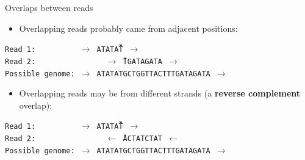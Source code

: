\documentclass[xcolor=dvipsnames]{beamer}
\begin{document}
\begin{frame}{Overlaps between reads}

    \begin{itemize}
    \item Overlapping reads probably came from adjacent positions:
    \end{itemize}

    {\tt Read 1: \ \ \ \ \ \ \ \ \ $\rightarrow$
        ATATAT\G{}\C{}\T{}\G{}\G{}\T{}\T{}\A{}\C{}\T{}\T{} $\rightarrow$ } \\
    {\tt Read 2: \ \ \ \ \ \ \ \ \ \ \ \ \ \ \ $\rightarrow$
        \G{}\C{}\T{}\G{}\G{}\T{}\T{}\A{}\C{}\T{}\T{}TGATAGATA $\rightarrow$ } \\
    {\tt Possible genome: $\rightarrow$ ATATATGCTGGTTACTTTGATAGATA $\rightarrow$}

    \begin{itemize}
        \item Overlapping reads may be from different strands (a {\bf reverse complement}
              overlap):
    \end{itemize}

    {\tt Read 1: \ \ \ \ \ \ \ \ \ $\rightarrow$
ATATAT\G{}\C{}\T{}\G{}\G{}\T{}\T{}\A{}\C{}\T{}\T{} $\rightarrow$ } \\
    {\tt Read 2: \ \ \ \ \ \ \ \ \ \ \ \ \ \ \ $\leftarrow$
        \C{}\G{}\A{}\C{}\C{}\A{}\A{}\T{}\G{}\A{}\A{}ACTATCTAT $\leftarrow$ } \\
    {\tt Possible genome: $\rightarrow$ ATATATGCTGGTTACTTTGATAGATA $\rightarrow$}
\end{frame}
\end{document}
